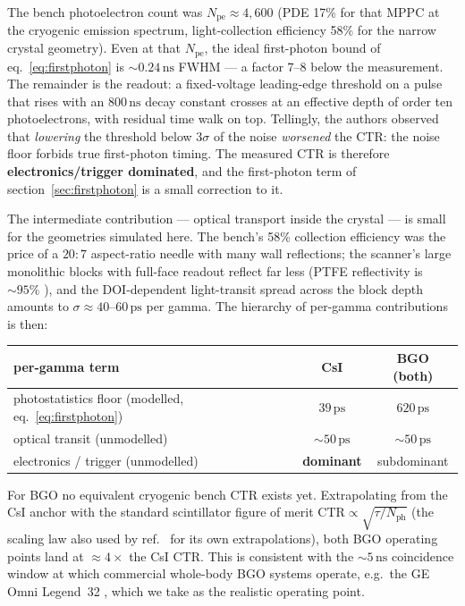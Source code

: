 \documentclass[11pt,a4paper]{article}
\newcommand{\ns}{\,\mathrm{ns}}
\newcommand{\ps}{\,\mathrm{ps}}
\begin{document}
The bench photoelectron count was $N_{\mathrm{pe}} \approx 4{,}600$ (PDE 17\% for that MPPC at
the cryogenic emission spectrum, light-collection efficiency 58\% for the narrow crystal
geometry). Even at that $N_{\mathrm{pe}}$, the ideal first-photon bound of
eq.~\eqref{eq:firstphoton} is ${\sim}0.24\ns$ FWHM --- a factor $7$--$8$ below the measurement.
The remainder is the readout: a fixed-voltage leading-edge threshold on a pulse that rises with
an $800\ns$ decay constant crosses at an effective depth of order ten photoelectrons, with
residual time walk on top. Tellingly, the authors observed that \emph{lowering} the threshold
below $3\sigma$ of the noise \emph{worsened} the CTR: the noise floor forbids true first-photon
timing. The measured CTR is therefore \textbf{electronics/trigger dominated}, and the
first-photon term of section~\ref{sec:firstphoton} is a small correction to it.

The intermediate contribution --- optical transport inside the crystal --- is small for the
geometries simulated here. The bench's 58\% collection efficiency was the price of a $20{:}7$
aspect-ratio needle with many wall reflections; the scanner's large monolithic blocks with
full-face readout reflect far less (PTFE reflectivity is ${\sim}95\%$ \cite{Janecek2012}), and
the DOI-dependent light-transit spread across the block depth amounts to
$\sigma \approx 40$--$60\ps$ per gamma. The hierarchy of per-gamma contributions is then:

\begin{center}
\begin{tabular}{lcc}
\toprule
per-gamma term & CsI & BGO (both) \\
\midrule
photostatistics floor (modelled, eq.~\ref{eq:firstphoton}) & $39\ps$  & $620\ps$ \\
optical transit (unmodelled)                               & ${\sim}50\ps$ & ${\sim}50\ps$ \\
electronics / trigger (unmodelled)                         & \textbf{dominant} & subdominant \\
\bottomrule
\end{tabular}
\end{center}

For BGO no equivalent cryogenic bench CTR exists yet. Extrapolating from the CsI anchor with
the standard scintillator figure of merit $\mathrm{CTR} \propto \sqrt{\tau/N_{\mathrm{ph}}}$
\cite{Conti2009} (the scaling law also used by ref.~\cite{Soleti2024} for its own
extrapolations), both BGO operating points land at ${\approx}4\times$ the CsI CTR. This is
consistent with the ${\sim}5\ns$ coincidence window at which commercial whole-body BGO systems
operate, e.g.\ the GE Omni Legend~32 \cite{Yamagishi2023}, which we take as the realistic
operating point.
\end{document}
